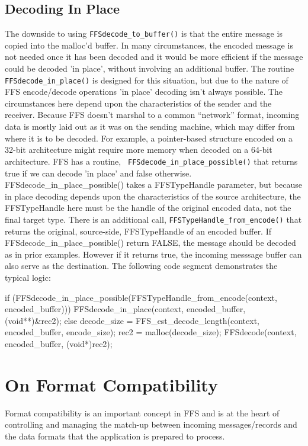\subsection{Decoding In Place}
The downside to using {\tt FFSdecode\_to\_buffer()} is that the entire
message is copied into the malloc'd buffer.  In many circumstances, the
encoded message is not needed once it has been decoded and it would be more
efficient if the message could be decoded 'in place', without involving an
additional buffer.  The routine {\tt FFSdecode\_in\_place()} is designed for
this situation, but due to the nature of FFS encode/decode operations 'in
place' decoding isn't always possible.  The circumstances here depend upon
the characteristics of the sender and the receiver.  Because FFS doesn't
marshal to a common ``network'' format, incoming data is mostly laid out as
it was on the sending machine, which may differ from where it is to be
decoded.  For example, a pointer-based structure encoded on a 32-bit
architecture might require more memory when decoded on a
64-bit architecture.  FFS has a routine, {\tt
  FFSdecode\_in\_place\_possible()} that returns true if we can decode 'in
place' and false otherwise.  FFSdecode\_in\_place\_possible() takes a
FFSTypeHandle parameter, but because in place decoding depends upon the
characteristics of the source architecture, the FFSTypeHandle here must be
the handle of the original encoded data, not the final target type.  There
is an additional call, {\tt FFSTypeHandle\_from\_encode()} that returns the
original, source-side, FFSTypeHandle of an encoded buffer.  If
FFSdecode\_in\_place\_possible() return FALSE, the message should be decoded
as in prior examples.  However if it returns true, the incoming messsage
buffer can also serve as the destination.  The following code segment
demonstrates the typical logic:
\begin{Code}
    if (FFSdecode_in_place_possible(FFSTypeHandle_from_encode(context, encoded_buffer))) {
	FFSdecode_in_place(context, encoded_buffer, (void**)&rec2);
    } else {
	decode_size = FFS_est_decode_length(context, encoded_buffer, encode_size);
	rec2 = malloc(decode_size);
	FFSdecode(context, encoded_buffer, (void*)rec2);
    }
\end{Code}

\section{On Format Compatibility\label{compat}}
Format compatibility is an important concept in FFS and is at the heart of
controlling and managing the match-up between incoming messages/records and
the data formats that the application is prepared to process.

